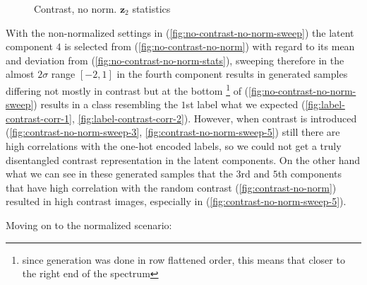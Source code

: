 \documentclass[12pt, english]{article}
\begin{document}
\begin{figure}[H]
\begin{minipage}[b]{0.5\linewidth}
    \caption{Contrast, no norm. \newline $\bm{z}_{2}$ statistics} 
    \label{fig:contrast-no-norm-stats}
  \end{minipage}
\end{figure}

\vspace{4mm}

\par With the non-normalized settings in (\ref{fig:no-contrast-no-norm-sweep}) the latent component $4$ is selected from (\ref{fig:no-contrast-no-norm}) with regard to its mean and deviation from (\ref{fig:no-contrast-no-norm-stats}), sweeping therefore in the almost $2\sigma$ range $[-2, 1]$ in the fourth component results in generated samples differing not mostly in contrast but at the bottom \footnote{since generation was done in row flattened order, this means that closer to the right end of the spectrum} of (\ref{fig:no-contrast-no-norm-sweep}) results in a class resembling the $1$st label what we expected (\ref{fig:label-contrast-corr-1}, \ref{fig:label-contrast-corr-2}). However, when contrast is introduced (\ref{fig:contrast-no-norm-sweep-3}, \ref{fig:contrast-no-norm-sweep-5}) still there are high correlations with the one-hot encoded labels, so we could not get a truly disentangled contrast representation in the latent components. On the other hand what we can see in these generated samples that the $3$rd and $5$th components that have high correlation with the random contrast (\ref{fig:contrast-no-norm}) resulted in high contrast images, especially in (\ref{fig:contrast-no-norm-sweep-5}).

\vspace{4mm}

\par Moving on to the normalized scenario:

\vspace{4mm}
\end{document}
